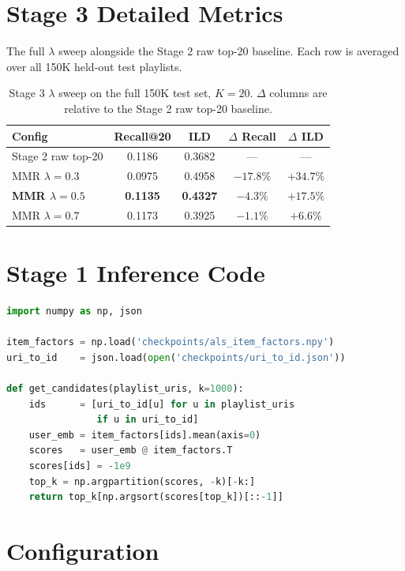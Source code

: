 \documentclass[11pt,a4paper]{article}
\begin{document}
\section{Stage 3 Detailed Metrics}

The full $\lambda$ sweep alongside the Stage 2 raw top-20 baseline. Each row is averaged over all 150K held-out test playlists.

\begin{table}[H]
\centering
\begin{tabular}{lcccc}
\toprule
\textbf{Config} & \textbf{Recall@20} & \textbf{ILD} & \textbf{$\Delta$ Recall} & \textbf{$\Delta$ ILD} \\
\midrule
Stage 2 raw top-20 & 0.1186 & 0.3682 & --- & --- \\
MMR $\lambda = 0.3$ & 0.0975 & 0.4958 & $-17.8\%$ & $+34.7\%$ \\
\textbf{MMR $\lambda = 0.5$} & \textbf{0.1135} & \textbf{0.4327} & $-4.3\%$ & $+17.5\%$ \\
MMR $\lambda = 0.7$ & 0.1173 & 0.3925 & $-1.1\%$ & $+6.6\%$ \\
\bottomrule
\end{tabular}
\caption{Stage 3 $\lambda$ sweep on the full 150K test set, $K=20$. $\Delta$ columns are relative to the Stage 2 raw top-20 baseline.}
\label{tab:stage3_sweep}
\end{table}

\section{Stage 1 Inference Code}

\begin{lstlisting}[language=Python]
import numpy as np, json

item_factors = np.load('checkpoints/als_item_factors.npy')
uri_to_id    = json.load(open('checkpoints/uri_to_id.json'))

def get_candidates(playlist_uris, k=1000):
    ids      = [uri_to_id[u] for u in playlist_uris 
                if u in uri_to_id]
    user_emb = item_factors[ids].mean(axis=0)
    scores   = user_emb @ item_factors.T
    scores[ids] = -1e9
    top_k = np.argpartition(scores, -k)[-k:]
    return top_k[np.argsort(scores[top_k])[::-1]]
\end{lstlisting}

\section{Configuration}
\end{document}
